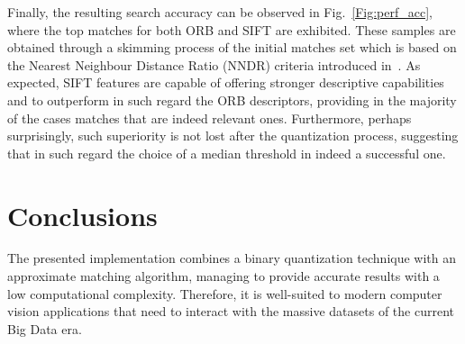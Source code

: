 \documentclass[a4paper, 11pt, oneside]{article}
\begin{document}
Finally, the resulting search accuracy can be observed in Fig.~\ref{Fig:perf_acc}, where the top matches for both ORB and SIFT are exhibited. These samples are obtained through a skimming process of the initial matches set which is based on the Nearest Neighbour Distance Ratio (NNDR) criteria introduced in~\cite{lowe2004distinctive}. 
\clearpage
As expected, SIFT features are capable of offering stronger descriptive capabilities and to outperform in such regard the ORB descriptors, providing in the majority of the cases matches that are indeed relevant ones. Furthermore, perhaps surprisingly, such superiority is not lost after the quantization process, suggesting that in such regard the choice of a median threshold in indeed a successful one.

\section*{Conclusions} 
The presented implementation combines a binary quantization technique with an approximate matching algorithm, managing to provide accurate results with a low computational complexity. Therefore, it is well-suited to modern computer vision applications that need to interact with the massive datasets of the current Big Data era.



\end{document}
